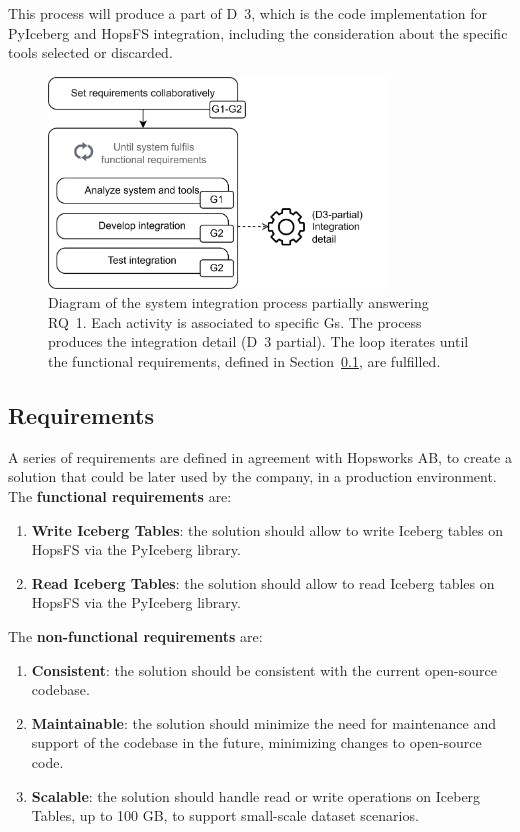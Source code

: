 This process will produce a part of \gls{D}~3, which is the code implementation for PyIceberg and \gls{HopsFS} integration, including the consideration about the specific tools selected or discarded.

\begin{figure}[!ht]
    \begin{center}
      \includegraphics[width=0.8\textwidth]{figures/3-method/method_code.png}
    \caption[System integration process]{Diagram of the system integration process partially answering \gls{RQ}~1. Each activity is associated to specific \glspl{G}. The process produces the integration detail (\gls{D}~3 partial). The loop iterates until the functional requirements, defined in Section~\ref{subsec:integration_reqs}, are fulfilled.}
    \label{fig:method_code_schema}
    \end{center}
\end{figure}


\subsection{Requirements}
\label{subsec:integration_reqs}
A series of requirements are defined in agreement with Hopsworks AB, to create a solution that could be later used by the company, in a production environment. The \textbf{functional requirements} are:
\begin{enumerate}
    \item \textbf{Write Iceberg Tables}: the solution should allow to write Iceberg tables on \gls{HopsFS} via the PyIceberg library.
    \item \textbf{Read Iceberg Tables}: the solution should allow to read Iceberg tables on \gls{HopsFS} via the PyIceberg library.
\end{enumerate}
The \textbf{non-functional requirements} are:
\begin{enumerate}
    \item \textbf{Consistent}: the solution should be consistent with the current open-source codebase.
    \item \textbf{Maintainable}: the solution should minimize the need for maintenance and support of the codebase in the future, minimizing changes to open-source code.
    \item \textbf{Scalable}: the solution should handle read or write operations on Iceberg Tables, up to 100 GB, to support small-scale dataset scenarios.
\end{enumerate}


